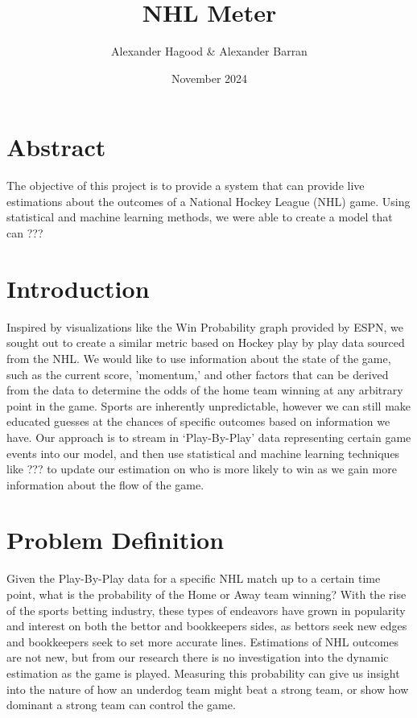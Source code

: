 \documentclass{article}
\title{NHL Meter}
\author{Alexander Hagood \& Alexander Barran}
\date{November 2024}
\begin{document}
\maketitle

\section{Abstract}
The objective of this project is to provide a system that can provide live estimations
about the outcomes of a National Hockey League (NHL) game. Using statistical and
machine learning methods, we were able to create a model that can ???
\section{Introduction}
Inspired by visualizations like the Win Probability graph provided by ESPN, we sought
out to create a similar metric based on Hockey play by play data sourced from the NHL.
We would like to use information about the state of the game, such as the current 
score, 'momentum,' and other factors that can be derived from the data to determine 
the odds of the home team winning at any arbitrary point in the game. Sports are 
inherently unpredictable, however we can still make educated guesses at the chances 
of specific outcomes based on information we have. Our approach is to stream in ‘Play-By-Play’ 
data representing certain game events into our model, and then use statistical and machine 
learning techniques like ??? to update our estimation on who is more likely to win as we 
gain more information about the flow of the game.


\section{Problem Definition}
Given the Play-By-Play data for a specific NHL match up to a certain time point, 
what is the probability of the Home or Away team winning? With the rise of the sports 
betting industry, these types of endeavors have grown in popularity and interest on 
both the bettor and bookkeepers sides, as bettors seek new edges and bookkeepers seek 
to set more accurate lines. Estimations of NHL outcomes are not new, but from our research 
there is no investigation into the dynamic estimation as the game is played. Measuring
this probability can give us insight into the nature of how an underdog team might
beat a strong team, or show how dominant a strong team can control the game.
\end{document}
